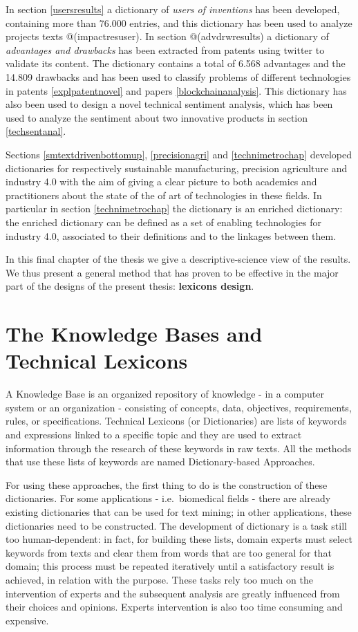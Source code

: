 \documentclass[]{book}
\theoremstyle{definition}
\theoremstyle{definition}
\theoremstyle{definition}
\theoremstyle{remark}
\begin{document}
In section \ref{usersresults} a dictionary of \emph{users of inventions}
has been developed, containing more than 76.000 entries, and this
dictionary has been used to analyze projects texts @(impactresuser). In
section @(advdrwresults) a dictionary of \emph{advantages and drawbacks}
has been extracted from patents using twitter to validate its content.
The dictionary contains a total of 6.568 advantages and the 14.809
drawbacks and has been used to classify problems of different
technologies in patents \ref{explpatentnovel} and papers
\ref{blockchainanalysis}. This dictionary has also been used to design a
novel technical sentiment analysis, which has been used to analyze the
sentiment about two innovative products in section \ref{techsentanal}.

Sections \ref{smtextdrivenbottomup}, \ref{precisionagri} and
\ref{technimetrochap} developed dictionaries for respectively
sustainable manufacturing, precision agriculture and industry 4.0 with
the aim of giving a clear picture to both academics and practitioners
about the state of the of art of technologies in these fields. In
particular in section \ref{technimetrochap} the dictionary is an
enriched dictionary: the enriched dictionary can be defined as a set of
enabling technologies for industry 4.0, associated to their definitions
and to the linkages between them.

In this final chapter of the thesis we give a descriptive-science view
of the results. We thus present a general method that has proven to be
effective in the major part of the designs of the present thesis:
\textbf{lexicons design}.

\section{The Knowledge Bases and Technical
Lexicons}\label{the-knowledge-bases-and-technical-lexicons}

A Knowledge Base is an organized repository of knowledge - in a computer
system or an organization - consisting of concepts, data, objectives,
requirements, rules, or specifications. Technical Lexicons (or
Dictionaries) are lists of keywords and expressions linked to a specific
topic and they are used to extract information through the research of
these keywords in raw texts. All the methods that use these lists of
keywords are named Dictionary-based Approaches.

For using these approaches, the first thing to do is the construction of
these dictionaries. For some applications - i.e.~biomedical fields -
there are already existing dictionaries that can be used for text
mining; in other applications, these dictionaries need to be
constructed. The development of dictionary is a task still too
human-dependent: in fact, for building these lists, domain experts must
select keywords from texts and clear them from words that are too
general for that domain; this process must be repeated iteratively until
a satisfactory result is achieved, in relation with the purpose. These
tasks rely too much on the intervention of experts and the subsequent
analysis are greatly influenced from their choices and opinions. Experts
intervention is also too time consuming and expensive.
\end{document}
